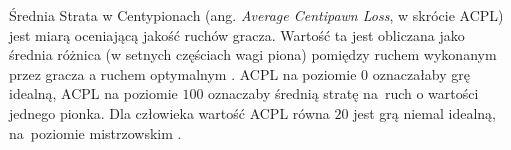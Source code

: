 Średnia Strata w Centypionach (ang. \emph{Average Centipawn Loss}, w skrócie ACPL) jest miarą oceniającą jakość ruchów gracza.
Wartość ta jest obliczana jako średnia różnica (w setnych częściach wagi piona) pomiędzy ruchem wykonanym przez gracza a ruchem optymalnym \cite*{acpl}.
ACPL na poziomie $0$ oznaczałaby grę idealną, ACPL na poziomie $100$ oznaczaby średnią stratę na~ruch o wartości jednego pionka.
Dla człowieka wartość ACPL równa $20$ jest grą niemal idealną, na~poziomie mistrzowskim \cite*{acpl-2}.

